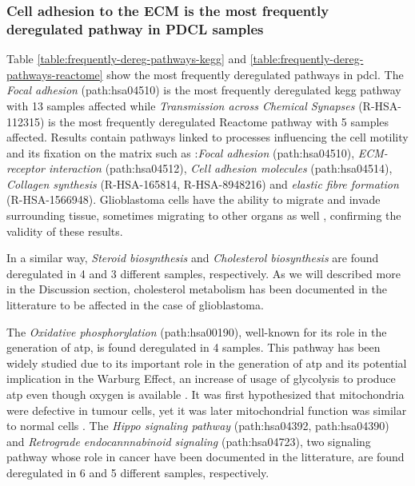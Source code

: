 \subsubsection{Cell adhesion to the ECM is the most frequently deregulated pathway in PDCL samples}

Table \ref*{table:frequently-dereg-pathways-kegg} and \ref*{table:frequently-dereg-pathways-reactome} show the most frequently deregulated pathways in \acrshort{pdcl}.
The \textit{Focal adhesion} (path:hsa04510) is the most frequently deregulated \acrshort{kegg} pathway with 13 samples affected while \textit{Transmission across Chemical Synapses} (R-HSA-112315) is the most frequently deregulated Reactome pathway with 5 samples affected.
Results contain pathways linked to processes influencing the cell motility and its fixation on the matrix such as :\textit{Focal adhesion} (path:hsa04510), \textit{ECM-receptor interaction} (path:hsa04512), \textit{Cell adhesion molecules} (path:hsa04514), \textit{Collagen synthesis} (R-HSA-165814, R-HSA-8948216) and \textit{elastic fibre formation} (R-HSA-1566948).
Glioblastoma cells have the ability to migrate and invade surrounding tissue, sometimes migrating to other organs as well \cite*{Lah2020}, confirming the validity of these results.

In a similar way, \textit{Steroid biosynthesis} and \textit{Cholesterol biosynthesis} are found deregulated in 4 and 3 different samples, respectively.
As we will described more in the Discussion section, cholesterol metabolism has been documented in the litterature to be affected in the case of glioblastoma.

The \textit{Oxidative phosphorylation} (path:hsa00190), well-known for its role in the generation of \acrshort{atp}, is found deregulated in 4 samples.
This pathway has been widely studied due to its important role in the generation of \acrshort{atp} and its potential implication in the Warburg Effect, an increase of usage of glycolysis to produce \acrshort{atp} even though oxygen is available \cite*{Spinicci2022}.
It was first hypothesized that mitochondria were defective in tumour cells, yet it was later mitochondrial function was similar to normal cells \cite*{Cairns2011}.
The \textit{Hippo signaling pathway} (path:hsa04392, path:hsa04390) and \textit{Retrograde endocannnabinoid signaling} (path:hsa04723), two signaling pathway whose role in cancer have been documented in the litterature, are found deregulated in 6 and 5 different samples, respectively.

